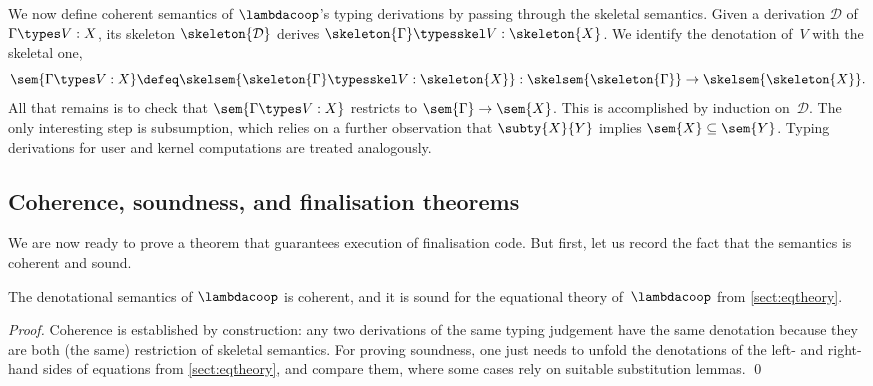 We now define coherent semantics of $\lambdacoop$'s typing derivations by passing
through the skeletal semantics. Given a derivation $\mathcal{D}$ of $\Gamma \types V : X$,
its skeleton $\skeleton{\mathcal{D}}$ derives
$\skeleton{\Gamma} \typesskel V : \skeleton{X}$.
We identify the denotation of~$V$ with the skeletal one,
%
\begin{equation*}
  \sem{\Gamma \types V : X} \defeq \skelsem{\skeleton{\Gamma} \typesskel V : \skeleton{X}} :
  \skelsem{\skeleton{\Gamma}} \to \skelsem{\skeleton{X}}.
\end{equation*}
%
All that remains is to check that $\sem{\Gamma \types V : X}$ restricts to
$\sem{\Gamma} \to \sem{X}$. This is accomplished by induction on~$\mathcal{D}$. 
The only interesting step is subsumption, which relies on a further
observation that $\subty{X}{Y}$ implies $\sem{X} \subseteq \sem{Y}$. Typing derivations for user and kernel
computations are treated analogously.

\subsection{Coherence, soundness, and finalisation theorems}
\label{sec:finalisation-theorem}

We are now ready to prove a theorem that guarantees execution of finalisation code. But
first, let us record the fact that the semantics is coherent and sound.

\begin{theorem}
  \label{thm:soundness-coherence}%
  The denotational semantics of $\lambdacoop$ is coherent, and it is sound for the equational
  theory of~$\lambdacoop$ from \cref{sect:eqtheory}.
\end{theorem}

\begin{proof}
  Coherence is established by construction: any two derivations of the same
  typing judgement have the same denotation because they are both
  (the same) restriction of skeletal semantics.
  For proving soundness, one just needs to unfold
  the denotations of the left- and right-hand sides of equations from \cref{sect:eqtheory},
  and compare them, where some cases rely on suitable substitution lemmas. \qed
\end{proof}

